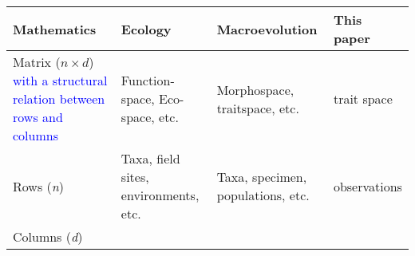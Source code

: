 \documentclass[]{article}
\begin{document}
\begin{longtable}[]{llll}
\toprule
\begin{minipage}[b]{0.2111\columnwidth}\raggedright\strut
Mathematics\strut
\end{minipage} & \begin{minipage}[b]{0.2111\columnwidth}\raggedright\strut
Ecology\strut
\end{minipage} & \begin{minipage}[b]{0.2111\columnwidth}\raggedright\strut
Macroevolution\strut
\end{minipage} & \begin{minipage}[b]{0.2111\columnwidth}\raggedright\strut
This paper\strut
\end{minipage}\tabularnewline
\midrule
\endhead
\begin{minipage}[t]{0.2111\columnwidth}\raggedright\strut
Matrix (\(n \times d\))
\textcolor{blue}{with a structural relation between rows and columns}\strut
\end{minipage} & \begin{minipage}[t]{0.2111\columnwidth}\raggedright\strut
Function-space, Eco-space, etc.\strut
\end{minipage} & \begin{minipage}[t]{0.2111\columnwidth}\raggedright\strut
Morphospace, traitspace, etc.\strut
\end{minipage} & \begin{minipage}[t]{0.2111\columnwidth}\raggedright\strut
trait space\strut
\end{minipage}\tabularnewline
\begin{minipage}[t]{0.2111\columnwidth}\raggedright\strut
Rows (\emph{n})\strut
\end{minipage} & \begin{minipage}[t]{0.2111\columnwidth}\raggedright\strut
Taxa, field sites, environments, etc.\strut
\end{minipage} & \begin{minipage}[t]{0.2111\columnwidth}\raggedright\strut
Taxa, specimen, populations, etc.\strut
\end{minipage} & \begin{minipage}[t]{0.2111\columnwidth}\raggedright\strut
observations\strut
\end{minipage}\tabularnewline
\begin{minipage}[t]{0.2111\columnwidth}\raggedright\strut
Columns (\emph{d})\strut
\end{minipage} & \begin{minipage}[t]{0.2111\columnwidth}\raggedright\strut

\end{minipage}
\end{longtable}
\end{document}
